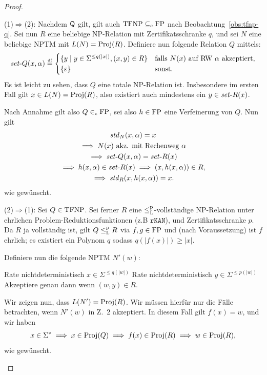 \begin{proof}
\begin{prooflist}[label={}]
\item (1)$\Rightarrow$(2): 
    Nachdem $\mathsf{Q}$ gilt, gilt auch $\mathrm{TFNP}\subseteq_\mathrm{c}\mathrm{FP}$ nach Beobachtung~\ref{obs:tfnp-q}.
    Sei nun $R$ eine beliebige NP-Relation mit Zertifikatsschranke $q$, und
    sei $N$ eine beliebige NPTM mit $L(N)=\operatorname{Proj}(R)$. 
    Definiere nun folgende Relation $Q$ mittels:
    \[ \mathit{set}\text{-}{}Q(x, \alpha) \stackrel{\text{\smash{\tiny df}}}{=}  \begin{cases} \{ y\mid y\in\Sigma^{\leq q(|x|)}, (x,y)\in R \} & \text{falls $N(x)$ auf RW $\alpha$ akzeptiert,} \\\{\varepsilon\} & \text{sonst.} \end{cases}\]
    Es ist leicht zu sehen, dass $Q$ eine totale NP-Relation ist. Insbesondere im ersten Fall gilt $x\in L(N)=\operatorname{Proj}(R)$, also existiert auch mindestens ein $y\in\mathit{set}\text{-}{}R(x)$.

    Nach Annahme gilt also $Q\in_\mathrm{c}\mathrm{FP}$, sei also $h\in\mathrm{FP}$ eine Verfeinerung von $Q$.
    Nun gilt
    \begin{gather*}
        \mathit{std}_N(x,\alpha)=x\\
        \implies N(x) \text{ akz. mit Rechenweg $\alpha$}\\
        \implies \mathit{set}\text{-}{}Q(x,\alpha) = \mathit{set}\text{-}{}R(x)\\
        \implies h(x,\alpha) \in \mathit{set}\text{-}{}R(x) \implies (x, h(x,\alpha))\in R,\\
        \implies \mathit{std}_R(x, h(x,\alpha))=x.
    \end{gather*}
    wie gewünscht.

\item (2)$\Rightarrow$(1): 
    Sei $Q\in\mathrm{TFNP}$. 
    Sei ferner $R$ eine $\leq_\mathrm{L}^\mathrm{p}$-vollständige NP-Relation unter ehrlichen Problem-Reduktionsfunktionen (z.B $\mathtt{rKAN}$), und Zertifikatsschranke $p$.
    Da $R$ ja vollständig ist, gilt $Q\leq_\mathrm{L}^\mathrm{p} R$ via $f,g\in\mathrm{FP}$ und (nach Voraussetzung) ist $f$ ehrlich; es existiert ein Polynom $q$ sodass $q(|f(x)|)\geq |x|$.

    Definiere nun die folgende NPTM $N'(w)$:\\%
    \begin{algorithm}[H]
        Rate nichtdeterministisch $x\in \Sigma^{\leq q(|w|)}$\;
        Rate nichtdeterministisch $y\in \Sigma^{\leq p(|w|)}$\;
        Akzeptiere genau dann wenn $(w,y)\in R$.
    \end{algorithm}
    Wir zeigen nun, dass $L(N')=\operatorname{Proj}(R)$. Wir müssen hierfür nur die Fälle betrachten, wenn $N'(w)$ in Z.~2 akzeptiert.
    In diesem Fall gilt $f(x)=w$, und wir haben
    \[ x\in\Sigma^* \implies x\in\operatorname{Proj}(Q) \implies f(x)\in\operatorname{Proj}(R) \implies w\in\operatorname{Proj}(R), \]
    wie gewünscht.


\end{prooflist}
\end{proof}
